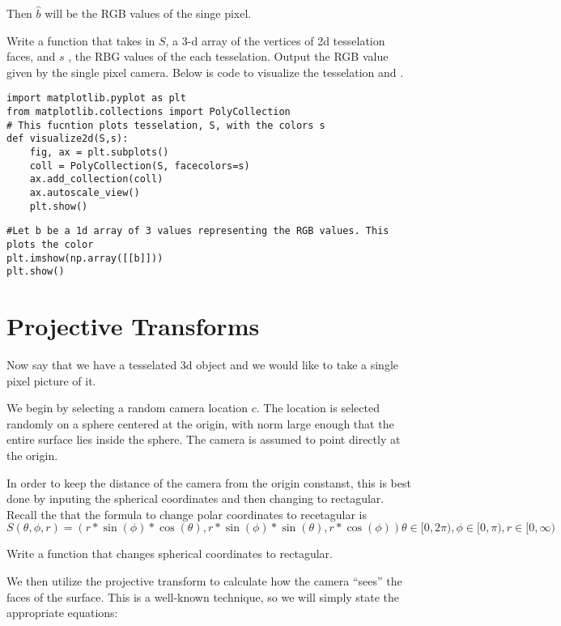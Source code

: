 Then $\hat{b}$ will be the RGB values of the singe pixel.

\begin{problem}
Write a function that takes in $S$, a 3-d array of the vertices of 2d tesselation faces, and $s$ , the RBG values of the each tesselation. Output the RGB value given by the single pixel camera. Below is code to visualize the tesselation and . 
\end{problem}

\begin{lstlisting}
import matplotlib.pyplot as plt
from matplotlib.collections import PolyCollection
# This fucntion plots tesselation, S, with the colors s 
def visualize2d(S,s):
    fig, ax = plt.subplots()
    coll = PolyCollection(S, facecolors=s)
    ax.add_collection(coll)
    ax.autoscale_view()
    plt.show()
\end{lstlisting}
\begin{lstlisting}
#Let b be a 1d array of 3 values representing the RGB values. This plots the color
plt.imshow(np.array([[b]]))
plt.show()
\end{lstlisting}

\section*{Projective Transforms}
Now say that we have a tesselated 3d object and we would like to take a single pixel picture of it.

We begin by selecting a random camera location $c$. The location is selected randomly on a sphere centered at the origin, with norm large enough that the entire surface lies inside the sphere. The camera is assumed to point directly at the origin.

In order to keep the distance of the camera from the origin constanst, this is best done by inputing the spherical coordinates and then changing to rectagular. Recall the that the formula to change polar coordinates to recetagular is 
\[
S(\theta,\phi,r)=(r*\sin(\phi)*\cos(\theta),r*\sin(\phi)*\sin(\theta),r*\cos(\phi))
\theta \in [0,2\pi),\phi \in [0,\pi), r \in [0,\infty)
\]
\begin{problem}
Write a function that changes spherical coordinates to rectagular.
\end{problem}

We then utilize the projective transform to calculate how the camera ``sees'' the faces of the surface. This is a well-known technique, so we will simply state the appropriate equations:

